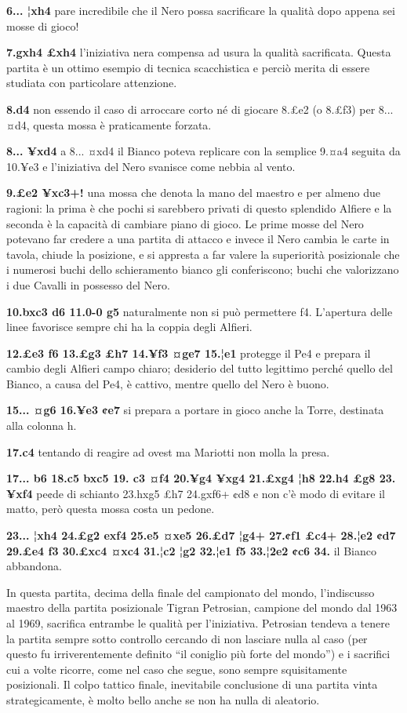 \textbf{6... ¦xh4} pare incredibile che il Nero possa sacrificare la
qualità dopo appena sei mosse di gioco!

\textbf{7.gxh4 £xh4} l'iniziativa nera compensa ad usura la qualità
sacrificata. Questa partita è un ottimo esempio di tecnica scacchistica
e perciò merita di essere studiata con particolare attenzione.

\textbf{8.d4} non essendo il caso di arroccare corto né di giocare 8.£e2
(o 8.£f3) per 8... ¤d4, questa mossa è praticamente forzata.

\textbf{8... ¥xd4} a 8... ¤xd4 il Bianco poteva replicare con la
semplice 9.¤a4 seguita da 10.¥e3 e l'iniziativa del Nero svanisce come
nebbia al vento.

\textbf{9.£e2 ¥xc3+!} una mossa che denota la mano del maestro e per
almeno due ragioni: la prima è che pochi si sarebbero privati di questo
splendido Alfiere e la seconda è la capacità di cambiare piano di gioco.
Le prime mosse del Nero potevano far credere a una partita di attacco e
invece il Nero cambia le carte in tavola, chiude la posizione, e si
appresta a far valere la superiorità posizionale che i numerosi buchi
dello schieramento bianco gli conferiscono; buchi che valorizzano i due
Cavalli in possesso del Nero.

\textbf{10.bxc3 d6 11.0-0 g5} naturalmente non si può permettere f4.
L'apertura delle linee favorisce sempre chi ha la coppia degli Alfieri.

\textbf{12.£e3 f6 13.£g3 £h7 14.¥f3 ¤ge7 15.¦e1} protegge il Pe4 e
prepara il cambio degli Alfieri campo chiaro; desiderio del tutto
legittimo perché quello del Bianco, a causa del Pe4, è cattivo, mentre
quello del Nero è buono.

\textbf{15... ¤g6 16.¥e3 ¢e7} si prepara a portare in gioco anche la
Torre, destinata alla colonna h.

\textbf{17.c4} tentando di reagire ad ovest ma Mariotti non molla la
presa.

\textbf{17... b6 18.c5 bxc5 19. c3 ¤f4 20.¥g4 ¥xg4 21.£xg4 ¦h8 22.h4 £g8
23. ¥xf4} pe¢de di schianto 23.hxg5 £h7 24.gxf6+ ¢d8 e non c'è modo di
evitare il matto, però questa mossa costa un pedone.

\textbf{23... ¦xh4 24.£g2 exf4 25.e5 ¤xe5 26.£d7 ¦g4+ 27.¢f1 £c4+ 28.¦e2
¢d7 29.£e4 f3 30.£xc4 ¤xc4 31.¦c2 ¦g2 32.¦e1 f5 33.¦2e2 ¢c6 34.} il
Bianco abbandona.

In questa partita, decima della finale del campionato del mondo,
l'indiscusso maestro della partita posizionale Tigran Petrosian,
campione del mondo dal 1963 al 1969, sacrifica entrambe le qualità per
l'iniziativa. Petrosian tendeva a tenere la partita sempre sotto
controllo cercando di non lasciare nulla al caso (per questo fu
irriverentemente definito ``il coniglio più forte del mondo'') e i
sacrifici cui a volte ricorre, come nel caso che segue, sono sempre
squisitamente posizionali. Il colpo tattico finale, inevitabile
conclusione di una partita vinta strategicamente, è molto bello anche se
non ha nulla di aleatorio.

